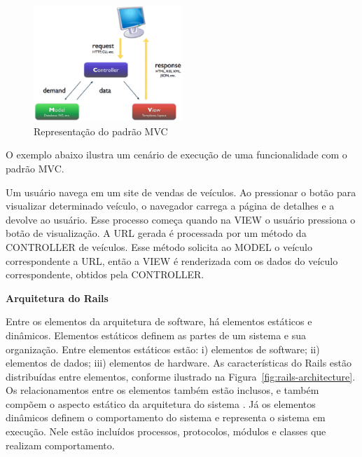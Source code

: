 \graphicspath{{figuras/}}
\begin{figure}[h]
\centering
\includegraphics[width=0.5\textwidth]{mvc}
\caption{Representação do padrão MVC}
\label{fig:mvc}
\end{figure}

O exemplo abaixo ilustra um cenário de execução de uma funcionalidade com o padrão MVC.

\begin{mdframed}[frametitle={Exemplo},roundcorner=5pt]
Um usuário navega em um site de vendas de veículos. Ao pressionar o botão para visualizar determinado veículo, o navegador carrega a página de detalhes e a devolve ao usuário. Esse processo começa quando na VIEW o usuário pressiona o botão de visualização. A URL gerada é processada por um método da CONTROLLER de veículos. Esse método solicita ao MODEL o veículo correspondente a URL, então a VIEW é renderizada com os dados do veículo correspondente, obtidos pela CONTROLLER.
\end{mdframed}



\textbf{Arquitetura do Rails}

Entre os elementos da arquitetura de software, há elementos estáticos e dinâmicos. Elementos estáticos definem as partes de um sistema e sua organização. Entre elementos estáticos estão: i) elementos de software; ii) elementos de dados; iii) elementos de hardware. 
%
As características do Rails estão distribuídas entre elementos, conforme ilustrado na Figura~\ref{fig:rails-architecture}.
%
Os relacionamentos entre os elementos também estão inclusos, e também compõem o aspecto estático da arquitetura do sistema \cite{germoglio2010fundamentos}.
%
Já os elementos dinâmicos definem o comportamento do sistema e representa o sistema em execução. Nele estão incluídos processos, protocolos, módulos e classes que realizam comportamento.


